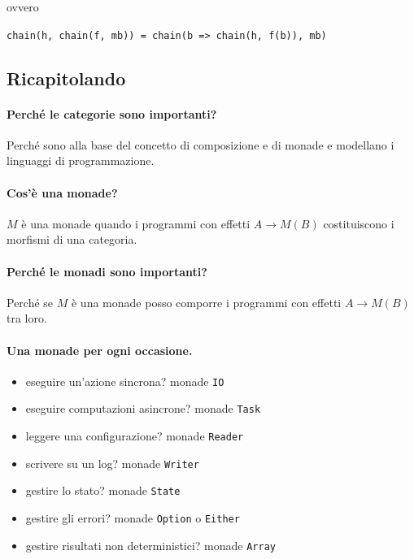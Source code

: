 \documentclass[12pt]{article}
\theoremstyle{definition}
\begin{document}
ovvero

\begin{center}
\texttt{chain(h, chain(f, mb)) = chain(b => chain(h, f(b)), mb)}
\end{center}

\subsection{Ricapitolando}

\paragraph{Perché le categorie sono importanti?}

Perché sono alla base del concetto di composizione e di monade e modellano i linguaggi di programmazione.

\paragraph{Cos'è una monade?}

$M$ è una monade quando i programmi con effetti $A \rightarrow M(B)$ costituiscono i morfismi di una categoria.

\paragraph{Perché le monadi sono importanti?}

Perché se $M$ è una monade posso comporre i programmi con effetti $A \rightarrow M(B)$ tra loro.

\paragraph{Una monade per ogni occasione.}

\begin{itemize}
  \item eseguire un'azione sincrona? monade \texttt{IO}
  \item eseguire computazioni asincrone? monade \texttt{Task}
  \item leggere una configurazione? monade \texttt{Reader}
  \item scrivere su un log? monade \texttt{Writer}
  \item gestire lo stato? monade \texttt{State}
  \item gestire gli errori? monade \texttt{Option} o \texttt{Either}
  \item gestire risultati non deterministici? monade \texttt{Array}
\end{itemize}
\end{document}

